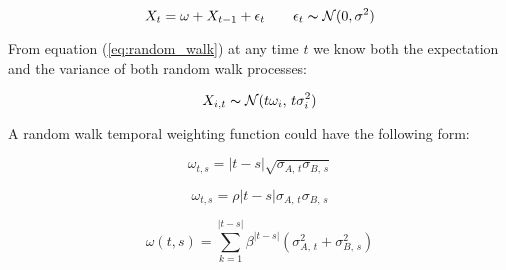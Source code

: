 \documentclass[12pt]{article}
\begin{document}
\begin{equation} \label{eq:random_walk}
    X_{t} = \omega + X_{t-1} + \epsilon_{t} \qquad \epsilon_{t} \thicksim \mathcal{N}(0, \sigma^{2})
\end{equation}

From equation (\ref{eq:random_walk}) at any time $t$ we know both the expectation and the variance of both random walk processes:

\begin{equation}
    X_{i,t} \thicksim \mathcal{N}(t\omega_{i}, \, t\sigma_{i}^{2})
\end{equation}

A random walk temporal weighting function could have the following form:

\begin{equation}
    \omega_{t, s} = \lvert t - s \rvert \sqrt{ \sigma_{A,\, t} \sigma_{B,\, s} }
\end{equation}

\begin{equation}
    \omega_{t, s} = \rho \lvert t - s \rvert \sigma_{A,\, t} \sigma_{B,\, s}
\end{equation}

\begin{equation}
    \omega(t, s) = \sum_{k=1}^{|t-s|} \beta^{|t-s|} \left( \sigma^{2}_{A,\, t} + \sigma^{2}_{B,\,s} \right)
\end{equation}
\end{document}
